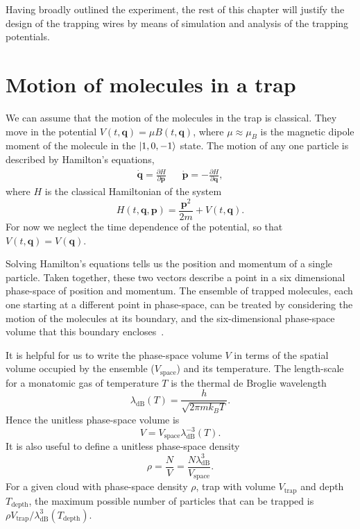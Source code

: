 Having broadly outlined the experiment, the rest of this chapter will justify
the design of the trapping wires by means of simulation and analysis
of the trapping potentials.

\section{Motion of molecules in a trap}
\label{design:motion}

We can assume that the motion of the molecules in the trap is classical. They
move in the potential $V(t, \mathbf{q}) = \mu B(t, \mathbf{q})$, where
$\mu\approx\mu_B$ is the magnetic dipole moment of the molecule in the
$\ket{1,0,-1}$ state.  The motion of any one particle is described by Hamilton's
equations,~\cite{Lichtenberg1969}
%
\begin{align}
  \label{design:eq:hamilton}
  \dot{\mathbf{q}} =  \frac{\partial H}{\partial \mathbf{p}} &&
  \dot{\mathbf{p}} = -\frac{\partial H}{\partial \mathbf{q}},
\end{align}
%
where $H$ is the classical Hamiltonian of the system
\begin{equation}
  H(t, \mathbf{q}, \mathbf{p}) = \frac{\mathbf{p}^2}{2m} + V(t, \mathbf{q}).
\end{equation}
For now we neglect the time dependence of the potential, so that $V(t,
\mathbf{q}) = V(\mathbf{q})$.

Solving Hamilton's equations tells us the position and momentum of a single
particle. Taken together, these two vectors describe a point in a six
dimensional phase-space of position and momentum. The ensemble of
trapped molecules, each one starting at a different point in phase-space, can
be treated by considering the motion of the molecules at its
boundary, and the six-dimensional phase-space volume that this
boundary encloses~\cite{Hand1998}.

It is helpful for us to write the phase-space volume $V$ in terms of the
spatial volume occupied by the ensemble ($V_\text{space}$) and its temperature.
The length-scale for a monatomic gas of temperature $T$ is the thermal de
Broglie wavelength~\cite{blundell2}
%
\begin{equation}
  \lambda_\text{dB}(T) = \frac{h}{\sqrt{2 \pi m k_B T}}.
\end{equation}
%
Hence the unitless phase-space volume is
%
\begin{equation}
  V = V_\text{space} \lambda_\text{dB}^{-3}(T).
\end{equation}
%
It is also useful to define a unitless phase-space
density~\cite{PhysRevA.52.1423}
%
\begin{equation}
  \rho = \frac{N}{V} = \frac{N \lambda_\text{dB}^3}{V_\text{space}}.
\end{equation}
%
For a given cloud with phase-space density $\rho$, trap with volume
$V_\text{trap}$ and depth $T_\text{depth}$,
the maximum possible number of particles that can be trapped is $\rho
V_\text{trap}/\lambda_\text{dB}^3(T_\text{depth})$.

